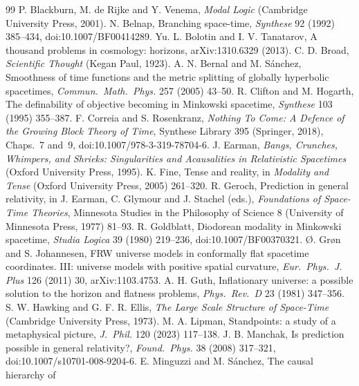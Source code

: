 \documentclass[11pt]{article}
\theoremstyle{definition}
\begin{document}
\begin{thebibliography}{99}
 P. Blackburn, M. de Rijke and Y. Venema, \emph{Modal Logic}
(Cambridge University Press, 2001).
 N. Belnap, Branching space-time, \emph{Synthese} 92 (1992)
385--434, doi:10.1007/BF00414289.
 Yu. L. Bolotin and I. V. Tanatarov, A thousand
problems in cosmology: horizons, arXiv:1310.6329 (2013).
 C. D. Broad, \emph{Scientific Thought} (Kegan Paul, 1923).
 A. N. Bernal and M. S\'anchez, Smoothness of time functions
and the metric splitting of globally hyperbolic spacetimes, \emph{Commun.\
Math.\ Phys.} 257 (2005) 43--50.
 R. Clifton and M. Hogarth, The definability of objective
becoming in Minkowski spacetime, \emph{Synthese} 103 (1995) 355--387.
\bibitem{CR2018} F. Correia and S. Rosenkranz, \emph{Nothing To Come:
A Defence of the Growing Block Theory of Time}, Synthese Library 395
(Springer, 2018), Chaps.~7 and~9, doi:10.1007/978-3-319-78704-6.
\bibitem{Earman1995} J. Earman, \emph{Bangs, Crunches, Whimpers, and Shrieks:
Singularities and Acausalities in Relativistic Spacetimes}
(Oxford University Press, 1995).
 K. Fine, Tense and reality, in \emph{Modality and Tense}
(Oxford University Press, 2005) 261--320.
 R. Geroch, Prediction in general relativity, in J. Earman,
C. Glymour and J. Stachel (eds.), \emph{Foundations of Space-Time Theories},
Minnesota Studies in the Philosophy of Science 8 (University of Minnesota
Press, 1977) 81--93.
 R. Goldblatt, Diodorean modality in Minkowski
spacetime, \emph{Studia Logica} 39 (1980) 219--236, doi:10.1007/BF00370321.
\bibitem{GronJohannesen2011} \O. Gr\o n and S. Johannesen, FRW universe models in
conformally flat spacetime coordinates. III: universe models with positive
spatial curvature, \emph{Eur.\ Phys.\ J. Plus} 126 (2011) 30,
arXiv:1103.4753.
 A. H. Guth, Inflationary universe: a possible solution to
the horizon and flatness problems, \emph{Phys.\ Rev.\ D} 23 (1981) 347--356.
\bibitem{HE1973} S. W. Hawking and G. F. R. Ellis, \emph{The Large Scale
Structure of Space-Time} (Cambridge University Press, 1973).
 M. A. Lipman, Standpoints: a study of a metaphysical
picture, \emph{J.\ Phil.} 120 (2023) 117--138.
 J. B. Manchak, Is prediction possible in general
relativity?, \emph{Found.\ Phys.} 38 (2008) 317--321,
doi:10.1007/s10701-008-9204-6.
 E. Minguzzi and M. S\'anchez, The causal hierarchy of

\end{thebibliography}
\end{document}
